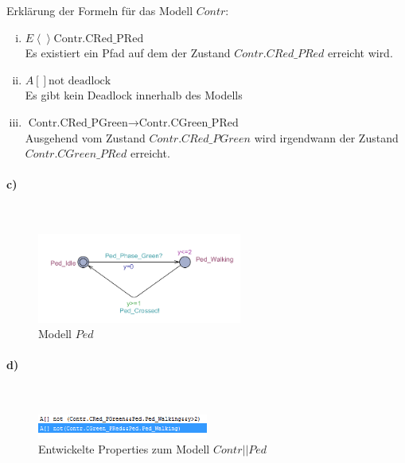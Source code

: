 Erklärung der Formeln für das Modell $Contr$:

\begin{enumerate}[i)]

	\item $E \left<\right> \text{Contr.CRed\_PRed} $\\
	Es existiert ein Pfad auf dem der Zustand $Contr.CRed\_PRed$ erreicht wird.
	
	\item $A[] \text{not deadlock}$ \\
	Es gibt kein Deadlock innerhalb des Modells
	
	\item $\text{Contr.CRed\_PGreen} \rightarrow  \text{Contr.CGreen\_PRed}$ \\
	Ausgehend vom Zustand $Contr.CRed\_PGreen$ wird irgendwann der Zustand $Contr.CGreen\_PRed$ erreicht.
	
\end{enumerate}

\paragraph{c)}\mbox{} \\

\begin{figure}[H] 
	\centering 
	\includegraphics[width=0.6\textwidth]{./UPAAAL_Screens/Pedestrian}
	\caption[Aufgabe 2c)]{Modell $Ped$}    
\end{figure}

\paragraph{d)}\mbox{} \\

\begin{figure}[H] 
	\centering 
	\includegraphics[width=0.5\textwidth]{./UPAAAL_Screens/2d_Verifyer}
	\caption[Aufgabe 2d)]{Entwickelte Properties zum Modell $Contr||Ped$}    
\end{figure}

